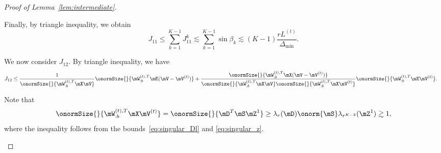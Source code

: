 \documentclass[lettersize,onecolumn,journal]{IEEEtran}
\theoremstyle{definition}
\theoremstyle{definition}
\begin{document}
\begin{proof}[Proof of Lemma~\ref{lem:intermediate}]
\begin{enumerate}[wide]
    
       Finally, by triangle inequality, we obtain
    \begin{equation}\label{eq:j1}
        J_{11} \leq \sum_{k = 1}^{K-1} J_{11}^k \lesssim  \sum_{k = 1}^{K-1} \sin \beta_k  \lesssim (K-1)\frac{r L^{(t)}}{\Delta_{\min}}.
    \end{equation}
    

    
    We now consider $J_{12}$. By triangle inequality, we have 
    \begin{align}
        J_{12} &\leq \frac{ 1}{\onormSize{}{\mW_{:b}^{(t),T} \mX \mV }} \onormSize{}{\mW_{:b}^{(t),T} \mE (\mV-\mV^{(t)})}   +
        \frac{ \onormSize{}{\mW_{:b}^{(t),T} \mX (\mV-\mV^{(t)})} }{\onormSize{}{\mW_{:b}^{(t),T} \mX \mV }\onormSize{}{\mW_{:b}^{(t),T} \mX \mV^{(t)} }} \onormSize{}{\mW_{:b}^{(t),T} \mE \mV^{(t)} }.
    \end{align}

     Note that 
    \begin{equation}\label{eq:j11_wxvt}
       \onormSize{}{\mW_{:b}^{(t),T} \mX \mV^{(t)}} = \onormSize{}{\mD^T \mS \mZ^1} \geq \lambda_r(\mD) \onorm{\mS} \lambda_{r^{K-2}}(\mZ^1) \gtrsim 1,
    \end{equation}
    where the inequality follows from the bounds~\eqref{eq:singular_Dl} and \eqref{eq:singular_z}.
    

\end{enumerate}
\end{proof}
\end{document}
